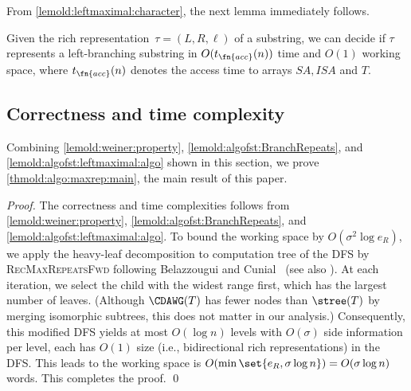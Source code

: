 From \cref{lemold:leftmaximal:character}, the next lemma immediately follows. 


\begin{lemma}
\label{lemold:algofst:leftmaximal:algo}  
Given  the rich representation~$\tau = (L, R, \ell)$ of a substring, we can decide if
  $\tau$ represents a left-branching substring in $O(t_\fn{acc}(n))$ time and $O(1)$ working space, where $t_\fn{acc}(n)$ denotes the access time to arrays $SA, ISA$ and $T$. 
\end{lemma}



\subsection{Correctness and time complexity}
Combining \cref{lemold:weiner:property}, \cref{lemold:algofst:BranchRepeats}, and \cref{lemold:algofst:leftmaximal:algo} shown in this section, we prove \cref{thmold:algo:maxrep:main}, the main result of this paper.  
  


\begin{proof}
  The correctness and time complexities follows from \cref{lemold:weiner:property}, \cref{lemold:algofst:BranchRepeats}, and \cref{lemold:algofst:leftmaximal:algo}. To bound the working space by $O(\sigma^2 \log e_R)$, we apply the heavy-leaf decomposition to computation tree of the DFS by  \textsc{RecMaxRepeatsFwd} following Belazzougui and Cunial~\cite[Lemma~4.2]{belazzougui2020linear} (see also \cite{hoare1962computj:quicksort}). 
  At each iteration, we select the child with the widest range first, which has the largest number of leaves.
  (Although $\CDAWG(T)$ has fewer  nodes than $\stree(T)$ by merging isomorphic subtrees, this does not matter in our analysis.) Consequently, this modified DFS yields at most $O(\log n)$ levels with $O(\sigma)$ side information per level, each has $O(1)$ size (i.e., bidirectional rich representations) in the DFS. This leads to the working space is $O(\min\set{e_R, \sigma\log n}) = O(\sigma\log n)$ words. This completes the proof. \qed 
\end{proof}


